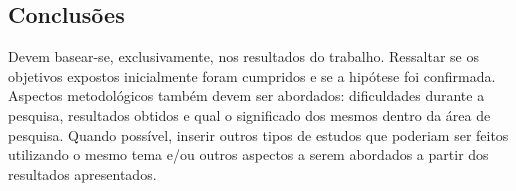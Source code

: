 \documentclass[a0,portrait]{a0poster}
\begin{document}
\begin{multicols}{2}
%






\section*{Conclus\~oes}
\vspace{-1cm}
Devem basear-se, exclusivamente, nos resultados do trabalho. Ressaltar se os objetivos expostos inicialmente foram cumpridos e se a hip\'otese foi confirmada. Aspectos metodol\'ogicos tamb\'em devem ser abordados: dificuldades durante a pesquisa, resultados obtidos e qual o significado dos mesmos dentro da \'area de pesquisa. Quando poss\'i­vel, inserir outros tipos de estudos que poderiam ser feitos utilizando o mesmo tema e/ou outros aspectos a serem abordados a partir dos resultados apresentados.



\vspace{-1cm}
\nocite{*} %
\begin{thebibliography}{100}


\end{thebibliography}
\end{multicols}
\end{document}
